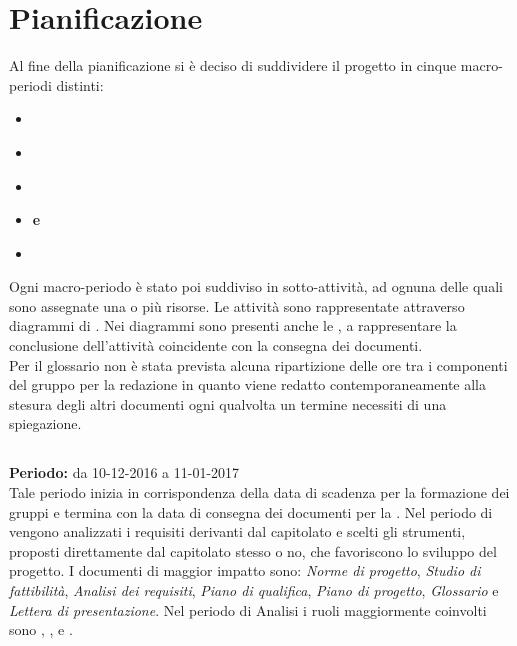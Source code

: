 \section{Pianificazione}

Al fine della pianificazione si è deciso di suddividere il progetto in cinque macro-periodi distinti:
\begin{itemize}
\item \textbf{\AR{}}
\item \textbf{\AD{}}
\item \textbf{\PA{}}
\item \textbf{\PD{} e \Cod{}}
\item \textbf{\VV{}}
\end{itemize}
Ogni macro-periodo è stato poi suddiviso in sotto-attività, ad ognuna delle quali sono assegnate una o più risorse. Le attività sono rappresentate attraverso diagrammi di . Nei diagrammi sono presenti anche le , a rappresentare la conclusione dell'attività coincidente con la consegna dei documenti. \\
Per il glossario non è stata prevista alcuna ripartizione delle ore tra i componenti del gruppo per la redazione in quanto viene redatto contemporaneamente alla stesura degli altri documenti ogni qualvolta un termine necessiti di una spiegazione.

\subsection{\AR{}}
\textbf{Periodo:} da 10-12-2016 a 11-01-2017 \\
Tale periodo inizia in corrispondenza della data di scadenza per la formazione dei gruppi e termina con la data di consegna dei documenti per la \RR{}. Nel periodo di \AR{} vengono analizzati i requisiti derivanti dal capitolato e scelti gli strumenti, proposti direttamente dal capitolato stesso o no, che favoriscono lo sviluppo del progetto. I documenti di maggior impatto sono: \textit{Norme di progetto}, \textit{Studio di fattibilità}, \textit{Analisi dei requisiti}, \textit{Piano di qualifica}, \textit{Piano di progetto}, \textit{Glossario} e \textit{Lettera di presentazione}.
Nel periodo di Analisi i ruoli maggiormente coinvolti sono \Analista{}, \Responsabile{}, \Amministratore{} e \Verificatore{}.

